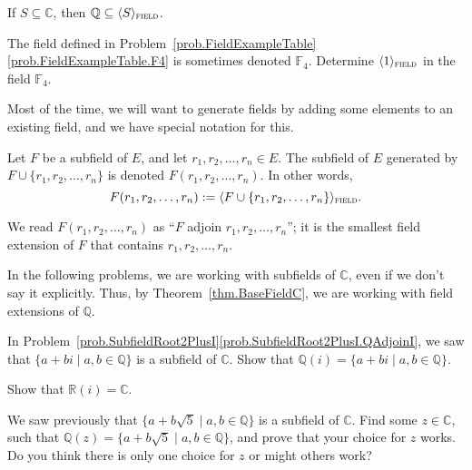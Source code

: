 \begin{theorem}\label{thm.BaseFieldC}
If $S\subseteq \mathbb{C}$, then  $\mathbb{Q} \subseteq \langle S \rangle_{\textsc{field}}$.
\end{theorem}

\begin{problem}
The field defined in Problem~\ref{prob.FieldExampleTable}\ref{prob.FieldExampleTable.F4} is sometimes denoted $\mathbb{F}_4$. Determine $\langle 1 \rangle_{\textsc{field}}$ in the field $\mathbb{F}_4$.
\end{problem}

Most of the time, we will want to generate fields by adding some elements to an existing field, and we have special notation for this.

\begin{notation}
Let $F$ be a subfield of $E$, and let $r_1,r_2,\ldots,r_n \in E$. The subfield of $E$ generated by $F\cup \{r_1,r_2,\ldots,r_n\}$ is denoted $F(r_1,r_2,\ldots,r_n)$. In other words, \[F(r_1,r_2,\ldots,r_n) := \langle F\cup \{r_1,r_2,\ldots,r_n\} \rangle_{\textsc{field}}.\]
\end{notation}

We read $F(r_1,r_2,\ldots,r_n)$  as ``$F$ adjoin $r_1,r_2,\ldots,r_n$''; it is the smallest field extension of $F$ that contains $r_1,r_2,\ldots,r_n$.

In the following problems, we are working with subfields of $\mathbb{C}$, even if we don't say it explicitly. Thus, by Theorem~\ref{thm.BaseFieldC}, we are working with field extensions of $\mathbb{Q}.$

\begin{problem}\label{prob.QAdjoinI}
In Problem~\ref{prob.SubfieldRoot2PlusI}\ref{prob.SubfieldRoot2PlusI.QAdjoinI}, we saw that $\{a+bi\mid a,b\in \mathbb{Q}\}$ is a subfield of $\mathbb{C}$. 
Show that $\mathbb{Q}(i) = \{a+bi\mid a,b\in \mathbb{Q}\}$. 
\end{problem}

\begin{problem}
Show that $\mathbb{R}(i) =\mathbb{C}$. 
\end{problem}

\begin{problem}\label{prob.QAdjoinRoot5}
We saw previously that $\{a+b\sqrt{5}\mid a,b\in \mathbb{Q}\}$ is a subfield of $\mathbb{C}$. Find some $z\in \mathbb{C}$, such that $\mathbb{Q}(z) = \{a+b\sqrt{5}\mid a,b\in \mathbb{Q}\}$, and prove that your choice for $z$ works. Do you think there is only one choice for $z$ or might others work?
\end{problem}

